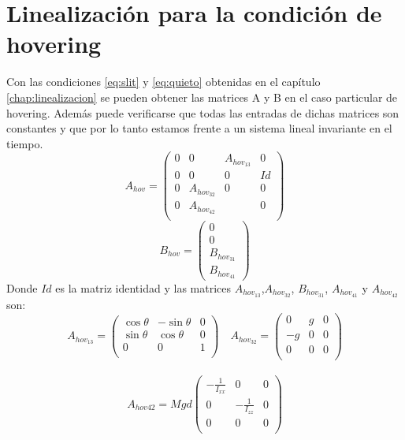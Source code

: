 \documentclass[main]{subfiles}
\begin{document}
\section{Linealizaci\'on para la condici\'on de hovering}
Con las condiciones \ref{eq:slit} y \ref{eq:quieto} obtenidas en el cap\'itulo \ref{chap:linealizacion} se pueden obtener las matrices A y B en el caso particular de hovering. Adem\'as puede verificarse que todas las entradas de dichas matrices son constantes y que por lo tanto estamos frente a un sistema lineal invariante en el tiempo.
\begin{equation}
\label{eq:Ahov}
A_{hov}=\left(\begin{array}{cccc}
0 & 0 & A_{hov_{13}} & 0 \\
0 & 0 & 0      & Id\\
0 & A_{hov_{32}} & 0 & 0\\
0 & A_{hov_{42}}      &  & 0 \\    
\end{array}\right)
\end{equation}
\begin{equation}
\label{eq:Bhov}
B_{hov}=\left(\begin{array}{c}
0\\
0\\
B_{hov_{31}}\\
B_{hov_{41}} 
\end{array}\right)
\end{equation}
Donde $Id$ es la matriz identidad y las matrices $A_{hov_{13}}$,$A_{hov_{32}}$, $B_{hov_{31}}$, $A_{hov_{41}}$ y $A_{hov_{42}}$ son:
\begin{equation}
A_{hov_{13}}=\left(\begin{array}{ccc}
\cos\theta & -\sin\theta & 0 \\
\sin\theta & \cos\theta & 0\\
0 & 0 &1\\
\end{array}\right) \quad 
A_{hov_{32}}=\left(\begin{array}{ccc}
0 & g & 0 \\
-g & 0 & 0\\
0 & 0 &0\\
\end{array}\right)
\end{equation}\\
\begin{equation}
A_{hov{42}} =Mgd\left(\begin{array}{ccc}
-\frac{1}{I_{xx}} & 0 & 0 \\
0 & -\frac{1}{I_{zz}} & 0\\
0 & 0 &0\\
\end{array}\right)
\end{equation}
\end{document}
